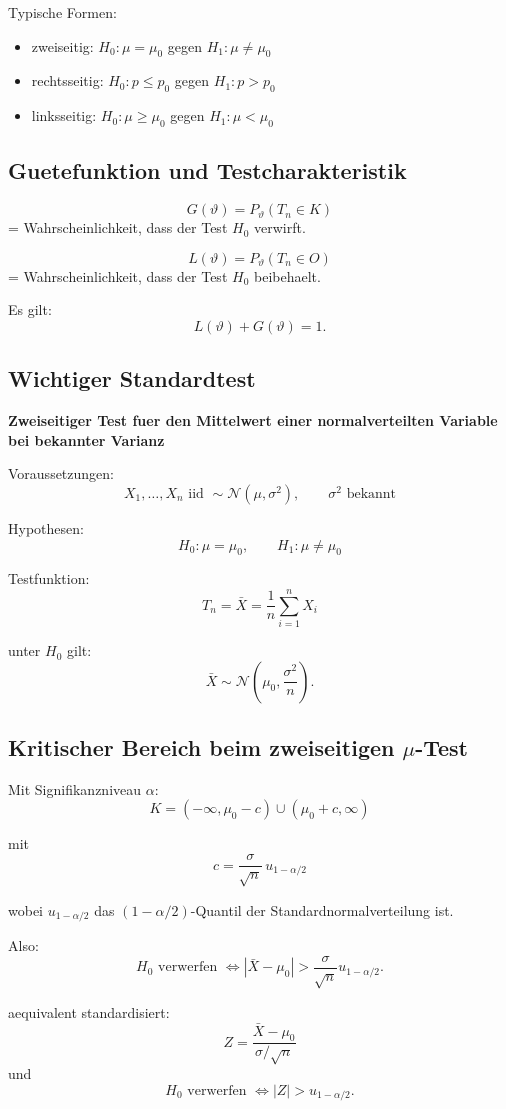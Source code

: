 \documentclass[a4paper,11pt]{article}
\begin{document}
Typische Formen:
\begin{itemize}
  \item zweiseitig: $H_0:\mu=\mu_0$ gegen $H_1:\mu\ne\mu_0$
  \item rechtsseitig: $H_0:p\le p_0$ gegen $H_1:p>p_0$
  \item linksseitig: $H_0:\mu\ge \mu_0$ gegen $H_1:\mu<\mu_0$
\end{itemize}

\subsection{Guetefunktion und Testcharakteristik}
\[
G(\vartheta)=P_\vartheta(T_n\in K)
\]
= Wahrscheinlichkeit, dass der Test $H_0$ verwirft.

\[
L(\vartheta)=P_\vartheta(T_n\in O)
\]
= Wahrscheinlichkeit, dass der Test $H_0$ beibehaelt.

Es gilt:
\[
L(\vartheta)+G(\vartheta)=1.
\]

\subsection{Wichtiger Standardtest}
\textbf{Zweiseitiger Test fuer den Mittelwert einer normalverteilten Variable bei bekannter Varianz}

Voraussetzungen:
\[
X_1,\dots,X_n \text{ iid } \sim \mathcal N(\mu,\sigma^2),\qquad \sigma^2 \text{ bekannt}
\]

Hypothesen:
\[
H_0:\mu=\mu_0,\qquad H_1:\mu\ne \mu_0
\]

Testfunktion:
\[
T_n=\bar X=\frac1n\sum_{i=1}^n X_i
\]

unter $H_0$ gilt:
\[
\bar X\sim \mathcal N\left(\mu_0,\frac{\sigma^2}{n}\right).
\]

\subsection{Kritischer Bereich beim zweiseitigen $\mu$-Test}
Mit Signifikanzniveau $\alpha$:
\[
K=\left(-\infty,\mu_0-c\right)\cup \left(\mu_0+c,\infty\right)
\]

mit
\[
c=\frac{\sigma}{\sqrt n}\,u_{1-\alpha/2}
\]

wobei $u_{1-\alpha/2}$ das $(1-\alpha/2)$-Quantil der Standardnormalverteilung ist.

Also:
\[
H_0 \text{ verwerfen } \Longleftrightarrow |\bar X-\mu_0|> \frac{\sigma}{\sqrt n}u_{1-\alpha/2}.
\]

aequivalent standardisiert:
\[
Z=\frac{\bar X-\mu_0}{\sigma/\sqrt n}
\]
und
\[
H_0 \text{ verwerfen } \Longleftrightarrow |Z|>u_{1-\alpha/2}.
\]
\end{document}
